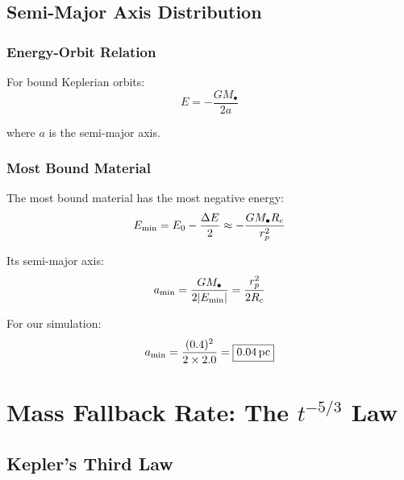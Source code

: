 \documentclass[twocolumn,amsmath,amssymb,prd,superscriptaddress,nofootinbib]{revtex4-2}
\begin{document}
\subsection{Semi-Major Axis Distribution}
\label{sec:sma}

\subsubsection{Energy-Orbit Relation}

For bound Keplerian orbits:
\begin{equation}
    E = -\frac{GM_\bullet}{2a}
    \label{eq:E_a}
\end{equation}

where $a$ is the semi-major axis.

\subsubsection{Most Bound Material}

The most bound material has the most negative energy:
\begin{equation}
    E_{\rm min} = E_0 - \frac{\Delta E}{2} \approx -\frac{GM_\bullet R_c}{r_p^2}
\end{equation}

Its semi-major axis:
\begin{equation}
    a_{\rm min} = \frac{GM_\bullet}{2|E_{\rm min}|} = \frac{r_p^2}{2R_c}
    \label{eq:a_min}
\end{equation}

For our simulation:
\begin{equation}
    a_{\rm min} = \frac{(0.4)^2}{2 \times 2.0} = \boxed{0.04\,{\rm pc}}
\end{equation}

\section{Mass Fallback Rate: The $t^{-5/3}$ Law}
\label{sec:fallback}

\subsection{Kepler's Third Law}
\label{sec:kepler}
\end{document}
